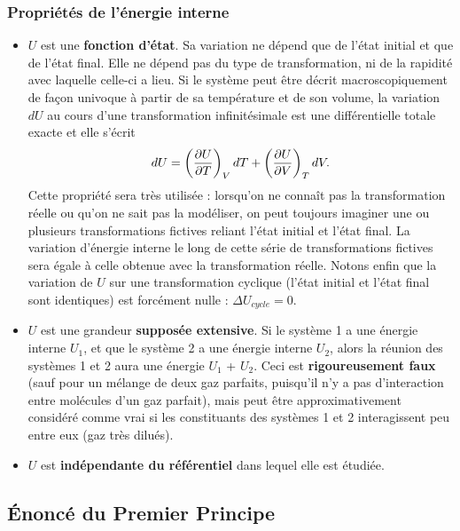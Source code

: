 \documentclass[11pt,a4paper]{report}
\begin{document}
\subsubsection{Propriétés de l'énergie interne}
\begin{itemize}
	\item $U$ est une \textbf{fonction d'état}. Sa variation ne dépend que de l'état initial et que de l'état final. Elle ne dépend pas du type de transformation, ni de la rapidité avec laquelle celle-ci a lieu. Si le système peut être décrit macroscopiquement de façon univoque à partir de sa température et de son volume, la variation $dU$ au cours d'une transformation infinitésimale est une différentielle totale exacte et elle s'écrit
	\begin{equation}
		dU = \left(\frac{\partial U}{\partial T}\right)_V dT + \left(\frac{\partial U}{\partial V}\right)_T dV.\\
	\end{equation}
	Cette propriété sera très utilisée : lorsqu'on ne connaît pas la transformation réelle ou qu'on ne sait pas la modéliser, on peut toujours imaginer une ou plusieurs 			transformations fictives reliant l'état initial et l'état final. La variation d'énergie interne le long de cette série de transformations fictives sera égale à celle 			obtenue avec la transformation réelle. Notons enfin que la variation de $U$ sur une transformation cyclique (l'état initial et l'état final sont identiques) 
	est forcément nulle : $\Delta U_{cycle} = 0$.\\
	
	\item $U$ est une grandeur \textbf{supposée extensive}. Si le système 1 a une énergie interne $U_1$, et que le système 2 a une énergie interne $U_2$, alors la réunion des systèmes 1 et 2 aura une énergie $U_1$ + $U_2$. Ceci est \textbf{rigoureusement faux} (sauf pour un mélange de deux gaz parfaits, puisqu'il n'y a pas d'interaction entre molécules d'un gaz parfait), mais peut être approximativement considéré comme vrai si les constituants des systèmes 1 et 2 interagissent peu entre eux (gaz très dilués).\\
	
	\item $U$ est \textbf{indépendante du référentiel} dans lequel elle est étudiée.
\end{itemize}

\subsection{\'Enoncé du Premier Principe}
\end{document}
